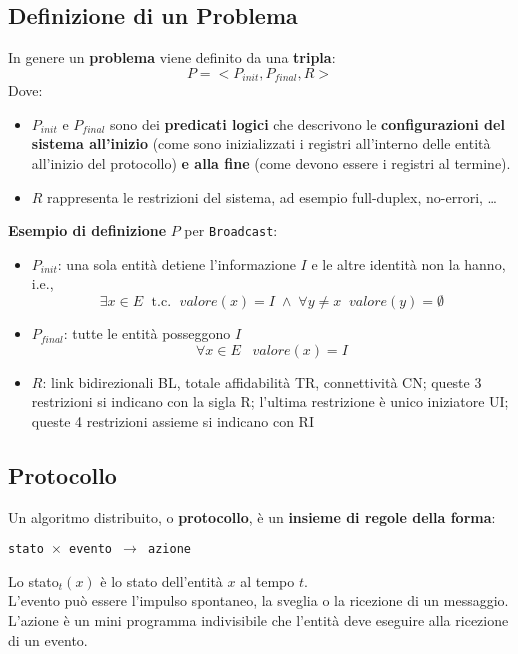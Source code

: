 \newpage

\subsection{Definizione di un Problema}

In genere un \textbf{problema} viene definito da una \textbf{tripla}: 
$$ P = <P_{init}, P_{final}, R> $$
Dove: 
\begin{itemize}
	\item $P_{init}$ e $P_{final}$ sono dei \textbf{predicati logici} che descrivono le \textbf{configurazioni del sistema all'inizio} (come sono inizializzati i registri all'interno delle entità all'inizio del protocollo) \textbf{e alla fine} (come devono essere i registri al termine).\\
	
	\item $R$ rappresenta le restrizioni del sistema, ad esempio full-duplex, no-errori, \dots\\
\end{itemize}

\textbf{Esempio di definizione} $P$ per \texttt{Broadcast}:
\begin{itemize}
	\item $P_{init}$: una sola entità detiene l'informazione $I$ e le altre identità non la hanno, i.e., 
	$$ \exists x \in E \; \text{ t.c. }\; valore(x) = I \; \wedge \; \forall y \neq x \;\; valore (y) = \emptyset $$
	
	\item $P_{final}$: tutte le entità posseggono $I$
	$$ \forall x \in E \;\;\; valore(x) = I $$
	
	\item $R$: link bidirezionali BL, totale affidabilità TR, connettività CN; queste 3 restrizioni si indicano con la sigla R; l'ultima restrizione è unico iniziatore UI; queste 4 restrizioni assieme si indicano con RI
\end{itemize}

\newpage

\subsection{Protocollo}

Un algoritmo distribuito, o \textbf{protocollo}, è un \textbf{insieme di regole della forma}: 
\begin{center}
	\texttt{stato $\times$ evento $\rightarrow$ azione}
\end{center}
Lo stato$_t (x)$ è lo stato dell'entità $x$ al tempo $t$. \\
L'evento può essere l'impulso spontaneo, la sveglia o la ricezione di un messaggio. \\
L'azione è un mini programma indivisibile che l'entità deve eseguire alla ricezione di un evento.\\

